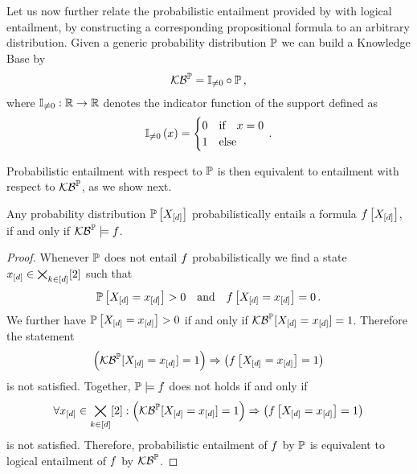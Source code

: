 
Let us now further relate the probabilistic entailment provided by  with logical entailment, by constructing a corresponding propositional formula to an arbitrary distribution.
Given a generic probability distribution $\mathbb{P}$ we can build a Knowledge Base by
\begin{align*}
    \mathcal{KB}^{\mathbb{P}} = \mathbb{I}_{\neq0} \circ \mathbb{P} \, ,
\end{align*}
where $\mathbb{I}_{\neq0}:\mathbb{R}\rightarrow \mathbb{R}$ denotes the indicator function of the support defined as
\begin{align}
    \mathbb{I}_{\neq0}\left(x\right)
    = \begin{cases}
          0 & \text{if} \quad x=0 \\
          1 & \text{else}
    \end{cases} \, .
\end{align}

Probabilistic entailment with respect to $\mathbb{P}$ is then equivalent to entailment with respect to $\mathcal{KB}^{\mathbb{P}}$, as we show next.

\begin{theorem}
    \label{the:entailmentProbToLogical}
    Any probability distribution $\mathbb{P}\left[X_{[d]}\right]$ probabilistically entails a formula $f\left[X_{[d]}\right]$, if and only if $\mathcal{KB}^{\mathbb{P}}\models f$.
\end{theorem}
\begin{proof}
    Whenever $\mathbb{P}$ does not entail $f$ probabilistically we find a state $x_{[d]}\in\bigtimes_{k\in[d]}[2]$ such that
    \begin{align*}
        \mathbb{P}\left[X_{[d]}=x_{[d]}\right] >0 \quad\text{and} \quad f\left[X_{[d]}=x_{[d]}\right] = 0 \, .
    \end{align*}
    We further have $\mathbb{P}\left[X_{[d]}=x_{[d]}\right]>0$ if and only if $\mathcal{KB}^{\mathbb{P}}[X_{[d]}=x_{[d]}]=1$.
    Therefore the statement
    \begin{align*}
        \left(\mathcal{KB}^{\mathbb{P}}[X_{[d]}=x_{[d]}]=1\right)\Rightarrow\left(f\left[X_{[d]}=x_{[d]}\right]=1\right)
    \end{align*}
    is not satisfied.
    Together, $\mathbb{P}\models f$ does not holds if and only if
    \begin{align*}
        \forall{x_{[d]}\in\bigtimes_{k\in[d]}[2]}:{\left(\mathcal{KB}^{\mathbb{P}}[X_{[d]}=x_{[d]}]=1\right)\Rightarrow\left(f\left[X_{[d]}=x_{[d]}\right]=1\right)}
    \end{align*}
    is not satisfied.
    Therefore, probabilistic entailment of $f$ by $\mathbb{P}$ is equivalent to logical entailment of $f$ by $\mathcal{KB}^{\mathbb{P}}$.
\end{proof}


